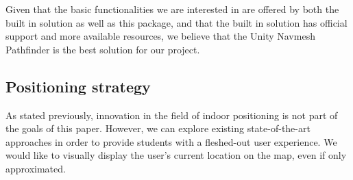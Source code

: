         \begin{table}[th]\small\linespread{1}
            \caption{Pathfinding solutions comparison}
            \label{3:tab:pathfinding}
            \centering
        \end{table}
        
        Given that the basic functionalities we are interested in are offered by both the built in solution as well as this package, and that the built in solution has official support and more available resources, we believe that the Unity Navmesh Pathfinder is the best solution for our project.
    
    \subsection{Positioning strategy}
    
        As stated previously, innovation in the field of indoor positioning is not part of the goals of this paper. However, we can explore existing state-of-the-art approaches in order to provide students with a fleshed-out user experience. We would like to visually display the user's current location on the map, even if only approximated.
        
